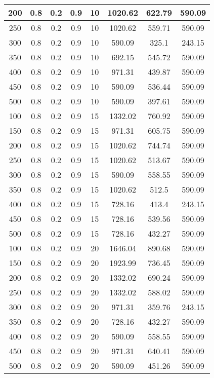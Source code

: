 \documentclass[a4paper, 12pt]{extreport}
\begin{document}
\begin{itemize}
\begin{longtable}{|c|c|c|c|c|c|c|c|}
			200 & 0.8 & 0.2 & 0.9 & 10 & 1020.62 & 622.79 & 590.09 \\\hline
			250 & 0.8 & 0.2 & 0.9 & 10 & 1020.62 & 559.71 & 590.09 \\\hline
			300 & 0.8 & 0.2 & 0.9 & 10 & 590.09 & 325.1 & 243.15 \\\hline
			350 & 0.8 & 0.2 & 0.9 & 10 & 692.15 & 545.72 & 590.09 \\\hline
			400 & 0.8 & 0.2 & 0.9 & 10 & 971.31 & 439.87 & 590.09 \\\hline
			450 & 0.8 & 0.2 & 0.9 & 10 & 590.09 & 536.44 & 590.09 \\\hline
			500 & 0.8 & 0.2 & 0.9 & 10 & 590.09 & 397.61 & 590.09 \\\hline
			100 & 0.8 & 0.2 & 0.9 & 15 & 1332.02 & 760.92 & 590.09 \\\hline
			150 & 0.8 & 0.2 & 0.9 & 15 & 971.31 & 605.75 & 590.09 \\\hline
			200 & 0.8 & 0.2 & 0.9 & 15 & 1020.62 & 744.74 & 590.09 \\\hline
			250 & 0.8 & 0.2 & 0.9 & 15 & 1020.62 & 513.67 & 590.09 \\\hline
			300 & 0.8 & 0.2 & 0.9 & 15 & 590.09 & 558.55 & 590.09 \\\hline
			350 & 0.8 & 0.2 & 0.9 & 15 & 1020.62 & 512.5 & 590.09 \\\hline
			400 & 0.8 & 0.2 & 0.9 & 15 & 728.16 & 413.4 & 243.15 \\\hline
			450 & 0.8 & 0.2 & 0.9 & 15 & 728.16 & 539.56 & 590.09 \\\hline
			500 & 0.8 & 0.2 & 0.9 & 15 & 728.16 & 432.27 & 590.09 \\\hline
			100 & 0.8 & 0.2 & 0.9 & 20 & 1646.04 & 890.68 & 590.09 \\\hline
			150 & 0.8 & 0.2 & 0.9 & 20 & 1923.99 & 736.45 & 590.09 \\\hline
			200 & 0.8 & 0.2 & 0.9 & 20 & 1332.02 & 690.24 & 590.09 \\\hline
			250 & 0.8 & 0.2 & 0.9 & 20 & 1332.02 & 588.02 & 590.09 \\\hline
			300 & 0.8 & 0.2 & 0.9 & 20 & 971.31 & 359.76 & 243.15 \\\hline
			350 & 0.8 & 0.2 & 0.9 & 20 & 728.16 & 432.27 & 590.09 \\\hline
			400 & 0.8 & 0.2 & 0.9 & 20 & 590.09 & 558.55 & 590.09 \\\hline
			450 & 0.8 & 0.2 & 0.9 & 20 & 971.31 & 640.41 & 590.09 \\\hline
			500 & 0.8 & 0.2 & 0.9 & 20 & 590.09 & 451.26 & 590.09 \\\hline

\end{longtable}
\end{itemize}
\end{document}
